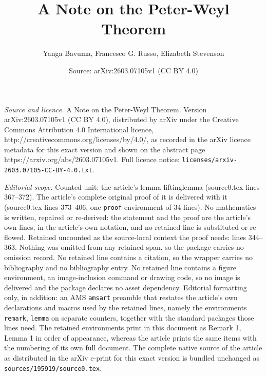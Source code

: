 \documentclass[10pt,a4paper]{amsart}
\title{A Note on the Peter-Weyl Theorem}
\author{Yanga Bavuma, Francesco G. Russo, Elizabeth Stevenson}
\date{Source: arXiv:2603.07105v1 (CC BY 4.0)}
\begin{document}
\maketitle

\noindent\emph{Source and licence.} A Note on the Peter-Weyl Theorem. Version arXiv:2603.07105v1 (CC BY 4.0), distributed by arXiv under the Creative Commons Attribution 4.0 International licence, http://creativecommons.org/licenses/by/4.0/, as recorded in the arXiv licence metadata for this exact version and shown on the abstract page https://arxiv.org/abs/2603.07105v1. Full licence notice: \texttt{licenses/arxiv-2603.07105-CC-BY-4.0.txt}.\par\smallskip

\noindent\textit{Editorial scope.} Counted unit: the article's lemma liftinglemma (source0.tex lines 367--372). The article's complete original proof of it is delivered with it (source0.tex lines 373--406, one \texttt{proof} environment of 34 lines). No mathematics is written, repaired or re-derived: the statement and the proof are the article's own lines, in the article's own notation, and no retained line is substituted or re-flowed.  Retained uncounted as the source-local context the proof needs: lines 344--363.  Nothing was omitted from any retained span, so the package carries no omission record.  No retained line contains a citation, so the wrapper carries no bibliography and no bibliography entry.  No retained line contains a figure environment, an image-inclusion command or drawing code, so no image is delivered and the package declares no asset dependency.  Editorial formatting only, in addition: an AMS \texttt{amsart} preamble that restates the article's own declarations and macros used by the retained lines, namely the environments \texttt{remark}, \texttt{lemma} on separate counters, together with the standard packages those lines need.  The retained environments print in this document as Remark 1, Lemma 1 in order of appearance, whereas the article prints the same items with the numbering of its own full document.  The complete native source of the article as distributed in the arXiv e-print for this exact version is bundled unchanged as \texttt{sources/195919/source0.tex}.
\end{document}
